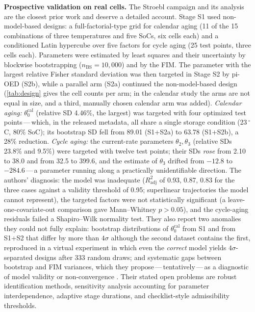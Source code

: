 \documentclass[11pt,letterpaper]{article}
\newcommand{\dash}{\,---\,}
\begin{document}
\textbf{Prospective validation on real cells.} The Stroebl campaign \cite{stroebl2024} and its analysis \cite{stroebl2026} are the closest prior work and deserve a detailed account. Stage S1 used non-model-based designs: a full-factorial-type grid for calendar aging (11 of the 15 combinations of three temperatures and five SoCs, six cells each) and a conditioned Latin hypercube over five factors for cycle aging (25 test points, three cells each). Parameters were estimated by least squares and their uncertainty by blockwise bootstrapping ($n_{\mathrm{BS}}=10{,}000$) and by the FIM. The parameter with the largest relative Fisher standard deviation was then targeted in Stage S2 by pi-OED (S2b), while a parallel arm (S2a) continued the non-model-based design (\cref{tab:design} gives the cell counts per arm; in the calendar study the arms are not equal in size, and a third, manually chosen calendar arm was added). \emph{Calendar aging:} $\theta_0^{\mathrm{cal}}$ (relative SD 4.46\%, the largest) was targeted with four optimized test points\dash which, in the released metadata, all share a single storage condition (23\,$^\circ$C, 80\% SoC); its bootstrap SD fell from 89.01 (S1+S2a) to 63.78 (S1+S2b), a 28\% reduction. \emph{Cycle aging:} the current-rate parameters $\theta_2,\theta_3$ (relative SDs 23.8\% and 9.5\%) were targeted with twelve test points; their SDs \emph{rose} from 2.10 to 38.0 and from 32.5 to 399.6, and the estimate of $\theta_3$ drifted from $-12.8$ to $-284.6$\dash a parameter running along a practically unidentifiable direction. The authors' diagnosis: the model was inadequate ($R^2_{\mathrm{adj}}$ of 0.93, 0.87, 0.83 for the three cases against a validity threshold of 0.95; superlinear trajectories the model cannot represent), the targeted factors were not statistically significant (a leave-one-covariate-out comparison gave Mann--Whitney $p>0.05$), and the cycle-aging residuals failed a Shapiro--Wilk normality test. They also report two anomalies they could not fully explain: bootstrap distributions of $\theta_0^{\mathrm{cal}}$ from S1 and from S1+S2 that differ by more than $4\sigma$ although the second dataset contains the first, reproduced in a virtual experiment in which even the \emph{correct} model yields $4\sigma$-separated designs after 333 random draws; and systematic gaps between bootstrap and FIM variances, which they propose\dash tentatively\dash as a diagnostic of model validity or non-convergence \cite{stroebl2026}. Their stated open problems are robust identification methods, sensitivity analysis accounting for parameter interdependence, adaptive stage durations, and checklist-style admissibility thresholds.
\end{document}
